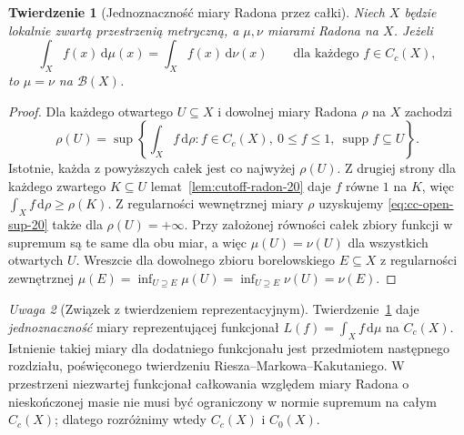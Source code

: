 \documentclass[11pt,a4paper,oneside]{book}
\numberwithin{equation}{chapter}
\theoremstyle{plain}
\newtheorem{twierdzenie}{Twierdzenie}[chapter]
\theoremstyle{definition}
\theoremstyle{remark}
\newtheorem{uwaga}[twierdzenie]{Uwaga}
\begin{document}
\begin{twierdzenie}[Jednoznaczność miary Radona przez całki]
\label{thm:uniqueness-cc-20}
Niech $X$ będzie lokalnie zwartą przestrzenią metryczną,
a $\mu,\nu$ miarami Radona na $X$. Jeżeli
\[
\int_X f(x)\,\mathrm d\mu(x)
=\int_Xf(x)\,\mathrm d\nu(x)
\qquad\text{dla każdego }f\in C_c(X),
\]
to $\mu=\nu$ na $\mathcal B(X)$.
\end{twierdzenie}
\begin{proof}
Dla każdego otwartego $U\subseteq X$ i dowolnej
miary Radona $\rho$ na $X$ zachodzi
\begin{equation}\label{eq:cc-open-sup-20}
\rho(U)=\sup\left\{\int_Xf\,\mathrm d\rho:
 f\in C_c(X),\ 0\le f\le1,\
 \operatorname{supp}f\subseteq U\right\}.
\end{equation}
Istotnie, każda z powyższych całek jest co najwyżej
$\rho(U)$. Z drugiej strony dla każdego zwartego
$K\subseteq U$ lemat~\ref{lem:cutoff-radon-20}
daje $f$ równe $1$ na $K$, więc
$\int_Xf\,\mathrm d\rho\ge\rho(K)$.
Z regularności wewnętrznej miary $\rho$
uzyskujemy \eqref{eq:cc-open-sup-20} także dla
$\rho(U)=+\infty$. Przy założonej równości całek
zbiory funkcji w supremum są te same dla obu miar,
a więc $\mu(U)=\nu(U)$ dla wszystkich otwartych $U$.
Wreszcie dla dowolnego zbioru borelowskiego
$E\subseteq X$ z regularności zewnętrznej
$\mu(E)=\inf_{U\supseteq E}\mu(U)
=\inf_{U\supseteq E}\nu(U)=\nu(E)$.
\end{proof}

\begin{uwaga}[Związek z twierdzeniem reprezentacyjnym]
Twierdzenie~\ref{thm:uniqueness-cc-20} daje
\emph{jednoznaczność} miary reprezentującej funkcjonał
$L(f)=\int_Xf\,\mathrm d\mu$ na $C_c(X)$.
Istnienie takiej miary dla dodatniego funkcjonału
jest przedmiotem następnego rozdziału, poświęconego
twierdzeniu Riesza--Markowa--Kakutaniego. W przestrzeni
niezwartej funkcjonał całkowania względem miary
Radona o nieskończonej masie nie musi być ograniczony
w normie supremum na całym $C_c(X)$; dlatego rozróżnimy
wtedy $C_c(X)$ i $C_0(X)$.
\end{uwaga}
\end{document}
